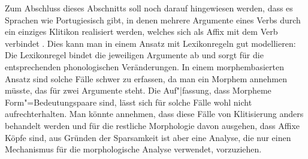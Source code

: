 

Zum Abschluss dieses Abschnitts soll noch darauf hingewiesen werden,
dass es Sprachen wie Portugiesisch gibt, in denen mehrere Argumente eines Verbs
durch ein einziges Klitikon realisiert werden, welches sich als Affix mit dem Verb
verbindet \citep[Abschnitt~2.1.1.4 und S.\,169--171]{Crysmann2002a}. 
Dies kann man in einem Ansatz mit Lexikonregeln gut modellieren: Die Lexikonregel bindet die jeweiligen
Argumente ab und sorgt für die entsprechenden phonologischen Veränderungen. In einem morphembasierten
Ansatz sind solche Fälle schwer zu erfassen, da man ein Morphem annehmen müsste, das für zwei Argumente
steht. Die Auf"|fassung, dass Morpheme Form"=Bedeutungspaare sind, lässt sich für solche Fälle wohl nicht
aufrechterhalten.
Man könnte annehmen, dass diese Fälle von Klitisierung anders behandelt werden und für die
restliche Morphologie davon ausgehen, dass Affixe Köpfe sind, aus Gründen der Sparsamkeit ist aber
eine Analyse, die nur einen Mechanismus für die morphologische Analyse verwendet, vorzuziehen.%
\largerpage

